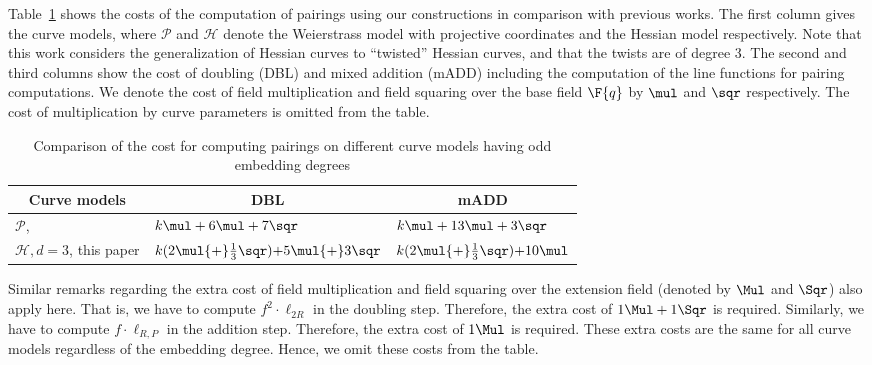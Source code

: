 Table~\ref{tbl-odd} shows the costs of the computation of pairings using our constructions in comparison with previous works.
The first column gives the curve models, where 
$\mathcal{P}$ and $\mathcal{H}$ denote the
Weierstrass model with projective coordinates and the Hessian model respectively.
Note that this work considers the generalization of Hessian curves to ``twisted'' Hessian curves, and that the twists are of degree 3.
The second and third columns show the cost of doubling (DBL) and mixed addition (mADD) including the computation of the line functions for pairing computations.
We denote the cost of field multiplication and field squaring over the base field $\F{q}$ by $\mul$ and $\sqr$ respectively.
The cost of multiplication by curve parameters is omitted from the table.

\begin{table}[h]
\centering
\caption{Comparison of the cost for computing pairings on different curve models having odd embedding degrees}

\begin{tabular}{ l | l | l}
\hline
\multicolumn{1}{c|}{Curve models}	&\multicolumn{1}{c|}{DBL}	&\multicolumn{1}{c}{mADD}	\\
\hline
$\mathcal{P}$, \cite{2010/CLN}	&$k\mul + 6\mul + 7\sqr$		&$k\mul + 13\mul + 3\sqr$	\\
$\mathcal{H},d=3$, this paper
				&$k(2\mul {+} \frac{1}{3}\sqr) {+} 5\mul {+} 3\sqr$
									&$k(2\mul {+} \frac{1}{3}\sqr) {+} 10\mul$	\\
\hline
\end{tabular}
\label{tbl-odd}


\end{table}

Similar remarks regarding the extra cost of field multiplication and field squaring over the extension field
(denoted by $\Mul$ and $\Sqr$) also apply here.
That is,
we have to compute $f^2 \cdot \ell_{2R}$ in the doubling step.
Therefore, the extra cost of $1\Mul + 1\Sqr$ is required.
Similarly, we have to compute $f \cdot \ell_{R,P}$ in the addition step.
Therefore, the extra cost of $1\Mul$ is required.
These extra costs are the same for all curve models regardless of the embedding degree.
Hence, we omit these costs from the table.

